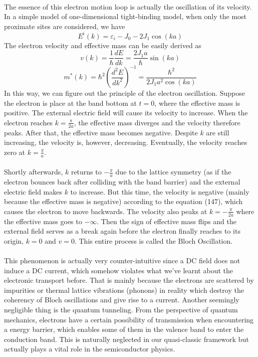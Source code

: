 \documentclass{article}
\begin{document}
\\
The essence of this electron motion loop is actually the oscillation of its velocity. In a simple model of one-dimensional tight-binding model, when only the most proximate sites are considered, we have\begin{equation}
    E^i(k)=\varepsilon_i-J_0-2J_1\cos(ka)
\end{equation}The electron velocity and effective mass can be easily derived as\begin{equation}
    v(k)=\frac{1}{\hbar}\frac{dE}{dk}=\frac{2J_1a}{\hbar}\sin(ka)
\end{equation}\begin{equation}
    m^*(k)=\hbar^2(\frac{d^2E}{dk^2})^{-1}=\frac{\hbar^2}{2J_1a^2\cos(ka)}
\end{equation}In this way, we can figure out the principle of the electron oscillation. Suppose the electron is place at the band bottom at $t=0$, where the effective mass is positive. The external electric field will cause its velocity to increase. When the electron reaches $k=\frac{\pi}{2a}$, the effective mass diverges and the velocity therefore peaks. After that, the effective mass becomes negative. Despite $k$ are still increasing, the velocity is, however, decreasing. Eventually, the velocity reaches zero at $k=\frac{\pi}{a}$.\\
\\
Shortly afterwards, $k$ returns to $-\frac{\pi}{a}$ due to the lattice symmetry (as if the electron bounces back after colliding with the band barrier) and the external electric field makes $k$ to increase. But this time, the velocity is negative (mainly because the effective mass is negative) according to the equation (147), which causes the electron to move backwards. The velocity also peaks at $k=-\frac{\pi}{2a}$ where the effective mass goes to $-\infty$. Then the sign of effective mass flips and the external field serves as a break again before the electron finally reaches to its origin, $k=0$ and $v=0$. This entire process is called the Bloch Oscillation.\\
\\
This phenomenon is actually very counter-intuitive since a DC field does not induce a DC current, which somehow violates what we've learnt about the electronic transport before. That is mainly because the electrons are scattered by impurities or thermal lattice vibrations (phonons) in reality which destroy the coherency of Bloch oscillations and give rise to a current. Another seemingly negligible thing is the quantum tunneling. From the perspective of quantum mechanics, electrons have a certain possibility of transmission when encountering a energy barrier, which enables some of them in the valence band to enter the conduction band. This is naturally neglected in our quasi-classic framework but actually plays a vital role in the semiconductor physics.\\
\end{document}
